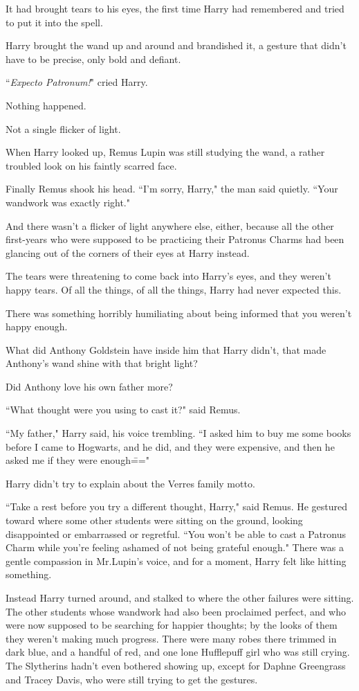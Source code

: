It had brought tears to his eyes, the first time Harry had remembered and tried to put it into the spell.

Harry brought the wand up and around and brandished it, a gesture that didn't have to be precise, only bold and defiant.

``\emph{Expecto Patronum!}" cried Harry.

Nothing happened.

Not a single flicker of light.

When Harry looked up, Remus Lupin was still studying the wand, a rather troubled look on his faintly scarred face.

Finally Remus shook his head. ``I'm sorry, Harry," the man said quietly. ``Your wandwork was exactly right."

And there wasn't a flicker of light anywhere else, either, because all the other first-years who were supposed to be practicing their Patronus Charms had been glancing out of the corners of their eyes at Harry instead.

The tears were threatening to come back into Harry's eyes, and they weren't happy tears. Of all the things, of all the things, Harry had never expected this.

There was something horribly humiliating about being informed that you weren't happy enough.

What did Anthony Goldstein have inside him that Harry didn't, that made Anthony's wand shine with that bright light?

Did Anthony love his own father more?

``What thought were you using to cast it?" said Remus.

``My father," Harry said, his voice trembling. ``I asked him to buy me some books before I came to Hogwarts, and he did, and they were expensive, and then he asked me if they were enough\==="

Harry didn't try to explain about the Verres family motto.

``Take a rest before you try a different thought, Harry," said Remus. He gestured toward where some other students were sitting on the ground, looking disappointed or embarrassed or regretful. ``You won't be able to cast a Patronus Charm while you're feeling ashamed of not being grateful enough." There was a gentle compassion in Mr.\?Lupin's voice, and for a moment, Harry felt like hitting something.

Instead Harry turned around, and stalked to where the other failures were sitting. The other students whose wandwork had also been proclaimed perfect, and who were now supposed to be searching for happier thoughts; by the looks of them they weren't making much progress. There were many robes there trimmed in dark blue, and a handful of red, and one lone Hufflepuff girl who was still crying. The Slytherins hadn't even bothered showing up, except for Daphne Greengrass and Tracey Davis, who were still trying to get the gestures.

